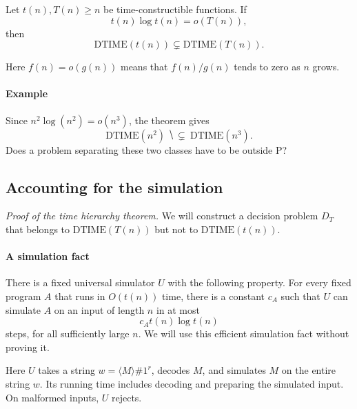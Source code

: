 \documentclass[11  pt]{article}
\begin{document}
\begin{theorem}
    Let $t(n),T(n)\geq n$ be time-constructible functions. If
    \begin{equation*}
        t(n)\log t(n)=o(T(n)),
    \end{equation*}
    then
    \begin{equation*}
        \mathrm{DTIME}(t(n))\subsetneq\mathrm{DTIME}(T(n)).
    \end{equation*}
\end{theorem}
Here $f(n)=o(g(n))$ means that $f(n)/g(n)$ tends to zero as $n$ grows.

\paragraph{Example}
Since $n^2\log(n^2)=o(n^3)$, the theorem gives
\begin{equation*}
    \mathrm{DTIME}(n^2)\ \hide{\subsetneq}\ \mathrm{DTIME}(n^3).
\end{equation*}
Does a problem separating these two classes have to be outside $\mathrm{P}$?
\vs{1cm}

\newpage
\subsection*{Accounting for the simulation}
\textit{Proof of the time hierarchy theorem.} We will construct a decision problem $D_T$ that belongs to $\mathrm{DTIME}(T(n))$ but not to $\mathrm{DTIME}(t(n))$.

\paragraph{A simulation fact}
There is a fixed universal simulator $U$ with the following property. For every fixed program $A$ that runs in $O(t(n))$ time, there is a constant $c_A$ such that $U$ can simulate $A$ on an input of length $n$ in at most
\begin{equation*}
    c_A t(n)\log t(n)
\end{equation*}
steps, for all sufficiently large $n$. We will use this efficient simulation fact without proving it.

Here $U$ takes a string $w=\langle M\rangle\#1^r$, decodes $M$, and simulates $M$ on the entire string $w$. Its running time includes decoding and preparing the simulated input. On malformed inputs, $U$ rejects.
\end{document}
